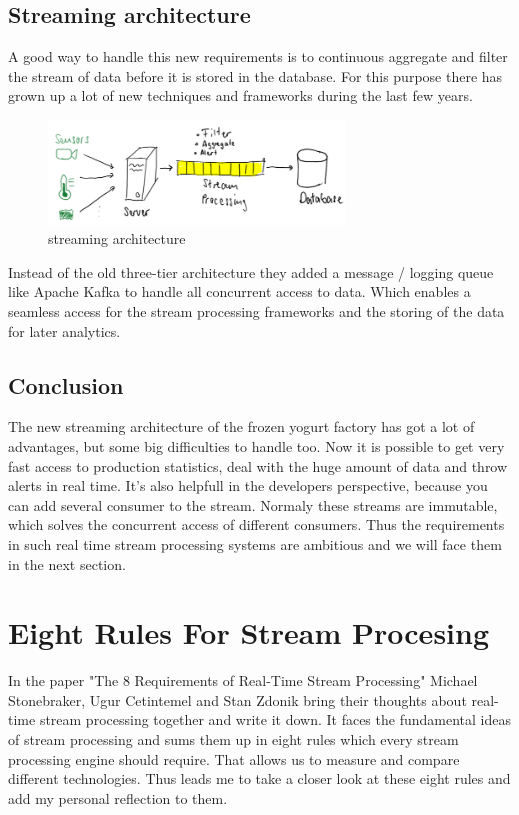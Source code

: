 \subsection{Streaming architecture}
A good way to handle this new requirements is to continuous aggregate and filter the stream of data before it is stored in the database.
For this purpose there has grown up a lot of new techniques and frameworks during the last few years.

\begin{figure}[H]
\centering
\captionsetup{justification=centering}
\includegraphics[width=0.7\textwidth]{images/stream.png}
\caption[streaming architecture]{streaming architecture}
\end{figure}

Instead of the old three-tier architecture they added a message / logging queue like Apache Kafka to handle all concurrent access to data.
Which enables a seamless access for the stream processing frameworks and the storing of the data for later analytics.

\subsection{Conclusion}
The new streaming architecture of the frozen yogurt factory has got a lot of advantages, but some big difficulties to handle too.
Now it is possible to get very fast access to production statistics, deal with the huge amount of data and throw alerts in real time.
It's also helpfull in the developers perspective, because you can add several consumer to the stream.
Normaly these streams are immutable, which solves the concurrent access of different consumers.
Thus the requirements in such real time stream processing systems are ambitious and we will face them in the next section.

\newpage

\section{Eight Rules For Stream Procesing}
In the paper "The 8 Requirements of Real-Time Stream Processing" Michael Stonebraker, Ugur Cetintemel and Stan Zdonik
bring their thoughts about real-time stream processing together and write it down. It faces the fundamental ideas of stream processing
and sums them up in eight rules which every stream processing engine should require.
That allows us to measure and compare different technologies.
Thus leads me to take a closer look at these eight rules and add my personal reflection to them.

